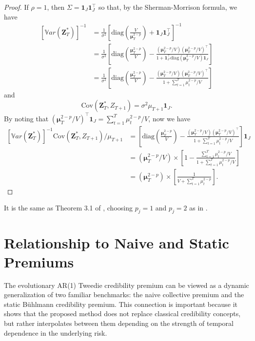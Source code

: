 \documentclass{sfuthesis}
\numberwithin{equation}{chapter}
\begin{document}
\begin{proof}
If $\rho=1$, then $\Sigma=\bm{1}_J\bm{1}_J^\top$ so that, by the Sherman-Morrison formula, we have
$$
\begin{aligned}
\left[\mathbb{V}ar(\bm{Z}_{T}^{*})\right]^{-1} &= \frac{1}{\sigma^2} \left[ \text{diag} \left( \frac{V}{\bm{\mu}_T^{2-p}} \right) + \bm{1}_J\bm{1}_J^\top  \right]^{-1} \\
&= \frac{1}{\sigma^2} \left[ \text{diag} \left( \frac{\bm{\mu}_T^{2-p}}{V} \right) - \frac{ \left( {\bm{\mu}_T^{2-p}}/{V} \right) \left( {\bm{\mu}_T^{2-p}}/{V} \right)^\top }{1+\bm{1}_J^\top \text{diag} \left( {\bm{\mu}_T^{2-p}}/{V} \right) \bm{1}_J} \right] \\
&= \frac{1}{\sigma^2} \left[ \text{diag} \left( \frac{\bm{\mu}_T^{2-p}}{V} \right) - \frac{ \left( {\bm{\mu}_T^{2-p}}/{V} \right) \left( {\bm{\mu}_T^{2-p}}/{V} \right)^\top }{1+ \sum_{t=1}^T \mu_t^{2-p}/V} \right]
\end{aligned}
$$
and
$$
\text{Cov}\left(\bm{Z}_{T}^{*}, Z_{T+1}\right)= \sigma^2 \mu_{T+1} \bm{1}_J.
$$
By noting that $\left( {\bm{\mu}_T^{2-p}}/{V} \right)^\top \bm{1}_J =\sum_{t=1}^T \mu_t^{2-p}/V$, now we have
$$
\begin{aligned}
\left[\mathbb{V}ar(\bm{Z}_{T}^{*})\right]^{-1}\text{Cov}\left(\bm{Z}_{T}^{*}, Z_{T+1}\right)/\mu_{T+1}&=\left[ \text{diag} \left( \frac{\bm{\mu}_T^{2-p}}{V} \right) - \frac{ \left( {\bm{\mu}_T^{2-p}}/{V} \right) \left( {\bm{\mu}_T^{2-p}}/{V} \right)^\top }{1+ \sum_{t=1}^T \mu_t^{2-p}/V} \right] \bm{1}_J \\
&= \left( {\bm{\mu}_T^{2-p}}/{V} \right)  \times \left[1- \frac{\sum_{t=1}^T \mu_t^{2-p}/V}{1+\sum_{t=1}^T \mu_t^{2-p}/V}\right] \\ 
&=  \left( {\bm{\mu}_T^{2-p}} \right)  \times \left[\frac{1}{V+\sum_{t=1}^T \mu_t^{2-p}}\right].
\end{aligned}
$$
\end{proof}


\noindent It is the same as Theorem 3.1 of
\citet{ohlsson2006exact}, choosing $p_j=1$ and $p_j=2$ as in \citet{frangos2001design}.


\section{Relationship to Naive and Static Premiums}
\label{subsec:naive-static}

The evolutionary AR(1) Tweedie credibility premium can be viewed as a dynamic
generalization of two familiar benchmarks: the naive collective premium and
the static B{\"u}hlmann credibility premium. This connection is important because
it shows that the proposed method does not replace classical credibility
concepts, but rather interpolates between them depending on the strength of
temporal dependence in the underlying risk.
\end{document}
